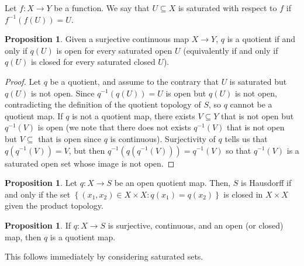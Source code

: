 \documentclass[12pt,reqno]{amsart}
\numberwithin{theorem}{section}
\theoremstyle{definition}
\theoremstyle{remark}
\numberwithin{equation}{section}
\newcommand{\set}[1]{\left \{ #1 \right \}}
\theoremstyle{definition}
\newtheorem{prop}[theorem]{Proposition}
\begin{document}
\begin{definition}
    Let $f:X\rightarrow Y$ be a function. We say that $U\subseteq X$ is saturated with respect to $f$ if $f^{-1}(f(U)) = U$.
\end{definition}
\begin{prop}
    Given a surjective continuous map $X\rightarrow Y$, $q$ is a quotient if and only if $q(U)$ is open for every saturated open $U$ (equivalently if and only if $q(U)$ is closed for every saturated closed $U$).
\end{prop}
\begin{proof}
    Let $q$ be a quotient, and assume to the contrary that $U$ is saturated but $q(U)$ is not open. Since $q^{-1}(q(U)) = U$ is open but $q(U)$ is not open, contradicting the definition of the quotient topology of $S$, so $q$ cannot be a quotient map. If $q$ is not a quotient map, there exists $V \subseteq Y$ that is not open but $q^{-1}(V)$ is open (we note that there does not exists $q^{-1}(V)$ that is not open but $V \subseteq $ that is open since $q$ is continuous). Surjectivity of $q$ tells us that $q(q^{-1}(V)) = V$, but then $q^{-1}(q(q^{-1}(V)))=q^{-1}(V)$ so that $q^{-1}(V)$ is a saturated open set whose image is not open.
\end{proof}

\begin{prop}\label{Prop3}
    Let $q:X\rightarrow S$ be an open quotient map. Then, $S$ is Hausdorff if and only if the set $\set{(x_1,x_2)\in X\times X:q(x_1)=q(x_2)}$ is closed in $X\times X$ given the product topology.
\end{prop}
\begin{prop}
    If $q:X\rightarrow S$ is surjective, continuous, and an open (or closed) map, then $q$ is a quotient map.
\end{prop}
This follows immediately by considering saturated sets.
\end{document}
